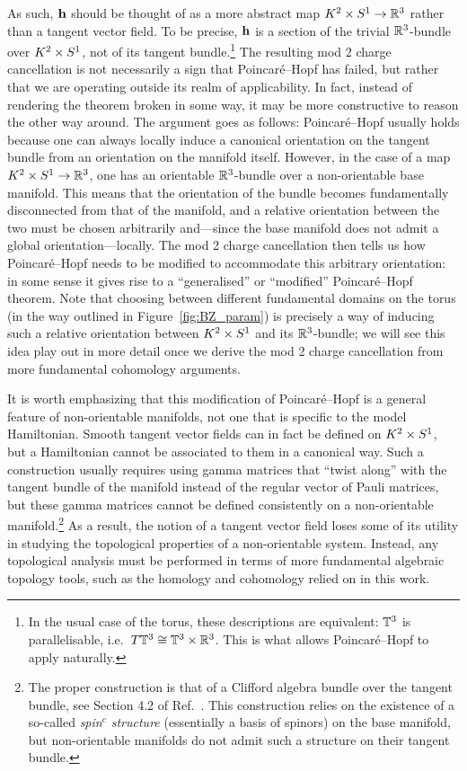 As such, $\vb{h}$ should be thought of as a more abstract map $K^2\times S^1\to\mathbb{R}^3$ rather than a tangent vector field. To be precise, $\vb{h}$ is a section of the trivial $\mathbb{R}^3$-bundle over $K^2\times S^1$, not of its tangent bundle.\footnote{
	In the usual case of the torus, these descriptions are equivalent: $\mathbb{T}^3$ is parallelisable, i.e.\ $T\mathbb{T}^3\cong \mathbb{T}^3\times\mathbb{R}^3$. This is what allows Poincaré--Hopf to apply naturally.}
The resulting mod 2 charge cancellation is not necessarily a sign that Poincaré--Hopf has failed, but rather that we are operating outside its realm of applicability. In fact, instead of rendering the theorem broken in some way, it may be more constructive to reason the other way around. The argument goes as follows: Poincaré--Hopf usually holds because one can always locally induce a canonical orientation on the tangent bundle from an orientation on the manifold itself. However, in the case of a map $K^2\times S^1\to\mathbb{R}^3$, one has an orientable $\mathbb{R}^3$-bundle over a non-orientable base manifold. This means that the orientation of the bundle becomes fundamentally disconnected from that of the manifold, and a relative orientation between the two must be chosen arbitrarily and---since the base manifold does not admit a global orientation---locally. The mod 2 charge cancellation then tells us how Poincaré--Hopf needs to be modified to accommodate this arbitrary orientation: in some sense it gives rise to a ``generalised'' or ``modified'' Poincaré--Hopf theorem. Note that choosing between different fundamental domains on the torus (in the way outlined in Figure~\ref{fig:BZ_param}) is precisely a way of inducing such a relative orientation between $K^2\times S^1$ and its $\mathbb{R}^3$-bundle; we will see this idea play out in more detail once we derive the mod 2 charge cancellation from more fundamental cohomology arguments.

It is worth emphasizing that this modification of Poincaré--Hopf is a general feature of non-orientable manifolds, not one that is specific to the model Hamiltonian. Smooth tangent vector fields can in fact be defined on $K^2\times S^1$, but a Hamiltonian cannot be associated to them in a canonical way. Such a construction usually requires using gamma matrices that ``twist along'' with the tangent bundle of the manifold instead of the regular vector of Pauli matrices, but these gamma matrices cannot be defined consistently on a non-orientable manifold.\footnote{
	The proper construction is that of a Clifford algebra bundle over the tangent bundle, see Section 4.2 of Ref.~\cite{Mathai_math-review}. This construction relies on the existence of a so-called \emph{spin$^c$ structure} (essentially a basis of spinors) on the base manifold, but non-orientable manifolds do not admit such a structure on their tangent bundle.}
As a result, the notion of a tangent vector field loses some of its utility in studying the topological properties of a non-orientable system. Instead, any topological analysis must be performed in terms of more fundamental algebraic topology tools, such as the homology and cohomology relied on in this work.

